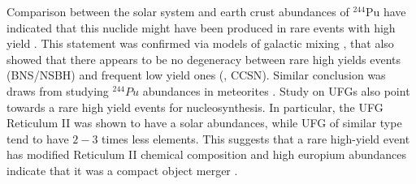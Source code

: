 %
%
Comparison between the solar system and earth crust abundances of $^{244}$Pu have indicated that this 
nuclide might have been produced in rare events with high yield \citep{Wallner:2015}. This statement 
was confirmed via models of galactic mixing \citep{Hotokezaka:2015zea}, that also showed that there 
appears to be no degeneracy between rare high yields events (\ac{BNS}/\ac{NSBH}) 
and frequent low yield ones (\ie, \ac{CCSN}). Similar conclusion was draws from studying $^{244}Pu$ 
abundances in meteorites \citep{Tsujimoto:2017}.
%
Study on \acp{UFG} also point towards a rare high yield events for \rproc{} nucleosynthesis. In particular, 
the \ac{UFG} Reticulum II was shown to have a solar \rproc{} abundances, while \ac{UFG} of similar type tend 
to have $2-3$ times less \rproc{} elements. This suggests that a rare high-yield event has modified 
Reticulum II chemical composition and high europium abundances indicate that it was a compact object merger 
\citep{Ji:2016}. 
%

